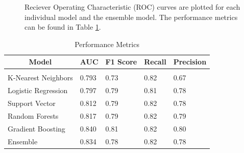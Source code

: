 \documentclass{article} %
\begin{document}
\begin{figure}[t]
\begin{center}
\end{center}
\caption{Reciever Operating Characteristic (ROC) curves are plotted for each individual model and the ensemble model. The performance metrics can be found in Table \ref{metrics_table}.}
\label{roc_individual}
\end{figure}

\begin{table}[h]
\caption{Performance Metrics}
\begin{center}
\begin{tabular}{lllll}
\multicolumn{1}{c}{\bf Model} &\multicolumn{1}{c}{\bf AUC} &\multicolumn{1}{c}{\bf F1 Score} &\multicolumn{1}{c}{\bf Recall} &\multicolumn{1}{c}{\bf Precision}
\\ \hline \\
K-Nearest Neighbors & 0.793 & 0.73 & 0.82 & 0.67 \\
Logistic Regression & 0.797 & 0.79 & 0.81 & 0.78 \\
Support Vector      & 0.812 & 0.79 & 0.82 & 0.78 \\
Random Forests      & 0.817 & 0.79 & 0.82 & 0.79 \\
Gradient Boosting   & 0.840 & 0.81 & 0.82 & 0.80 \\
Ensemble            & 0.834 & 0.78 & 0.82 & 0.78 \\
\end{tabular}
\end{center}
\label{metrics_table}
\end{table}
\end{document}
